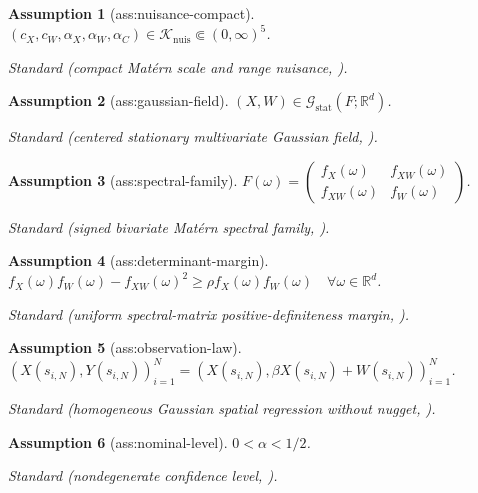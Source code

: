 \documentclass{article}
\newtheorem{assumption}{Assumption}
\begin{document}
\begin{assumption}[ass:nuisance-compact]\label{ass:nuisance-compact}
\((c_X,c_W,\alpha_X,\alpha_W,\alpha_C)\in\mathcal K_{\mathrm{nuis}}\Subset(0,\infty)^5\).
\par\smallskip\noindent\emph{Standard} (compact Mat\'ern scale and range nuisance, \cite{Li2022}).
\end{assumption}

\begin{assumption}[ass:gaussian-field]\label{ass:gaussian-field}
\((X,W)\in\mathcal G_{\mathrm{stat}}(F;\mathbb R^d)\).
\par\smallskip\noindent\emph{Standard} (centered stationary multivariate Gaussian field, \cite{LimStein2008}).
\end{assumption}

\begin{assumption}[ass:spectral-family]\label{ass:spectral-family}
\(F(\omega)=\begin{pmatrix}f_X(\omega)&f_{XW}(\omega)\\f_{XW}(\omega)&f_W(\omega)\end{pmatrix}\).
\par\smallskip\noindent\emph{Standard} (signed bivariate Mat\'ern spectral family, \cite{GneitingKleiberSchlather2010}).
\end{assumption}

\begin{assumption}[ass:determinant-margin]\label{ass:determinant-margin}
\(f_X(\omega)f_W(\omega)-f_{XW}(\omega)^2\ge\rho f_X(\omega)f_W(\omega)\quad\forall\omega\in\mathbb R^d\).
\par\smallskip\noindent\emph{Standard} (uniform spectral-matrix positive-definiteness margin, \cite{GneitingKleiberSchlather2010}).
\end{assumption}

\begin{assumption}[ass:observation-law]\label{ass:observation-law}
\((X(s_{i,N}),Y(s_{i,N}))_{i=1}^N=(X(s_{i,N}),\beta X(s_{i,N})+W(s_{i,N}))_{i=1}^N\).
\par\smallskip\noindent\emph{Standard} (homogeneous Gaussian spatial regression without nugget, \cite{DattaStein2026}).
\end{assumption}

\begin{assumption}[ass:nominal-level]\label{ass:nominal-level}
\(0<\alpha<1/2\).
\par\smallskip\noindent\emph{Standard} (nondegenerate confidence level, \cite{CaiLow2004}).
\end{assumption}
\end{document}
